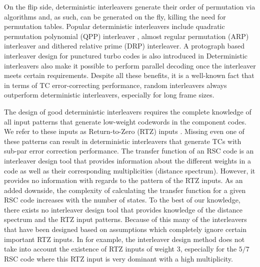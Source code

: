 On the flip side, deterministic interleavers generate their order of 
permutation via \newline algorithms and, as such, can be generated on the fly, killing the need for permutation tables. 
Popular deterministic interleavers include quadratic permutation polynomial (QPP) interleaver \cite{ref5}, almost regular permutation (ARP) interleaver and dithered relative prime (DRP) interleaver. A protograph based interleaver design for punctured turbo codes is also introduced in \cite{ref7}
Deterministic interleavers also make it possible to perform parallel decoding once the interleaver meets certain requirements. Despite all these benefits, it is a well-known fact that in terms of TC error-correcting performance, random interleavers always outperform deterministic interleavers, especially for long frame sizes.

The design of good deterministic interleavers requires the complete knowledge of all input patterns that generate low-weight codewords in the component codes. We refer to these inputs as Return-to-Zero (RTZ) inputs \cite{ref6}. Missing even one of these patterns can result in deterministic interleavers that generate TCs with sub-par error correction performance.
The transfer function of an RSC code is an interleaver design tool that provides information about the different weights in a code as well as their corresponding multiplicities (distance spectrum). However, it provides no information with regards to the pattern of the RTZ inputs. As an added downside, the complexity of calculating the transfer function for a given RSC code increases with the number of states. To the best of our knowledge, there exists no interleaver design tool that provides knowledge of the distance spectrum and the RTZ input patterns. Because of this many of the interleavers that have been designed based on assumptions which completely ignore certain important RTZ inputs. In \cite{ref5} for example, the interleaver design method does not take into account the existence of RTZ inputs of weight 3, especially for the $5/7$  RSC code where this RTZ input is very dominant with a high multiplicity.

